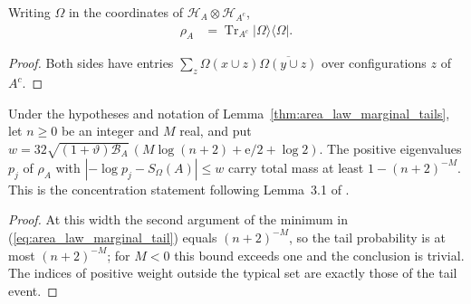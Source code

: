 \begin{lemma}
    \label{thm:area_law_cut_marginal}
    \leanok
    Writing $\Omega$ in the coordinates of $\mathcal H_A\otimes\mathcal H_{A^c}$,
    \begin{align}
        \rho_A & =\operatorname{Tr}_{A^c}|\Omega\rangle\langle\Omega|.
    \end{align}
\end{lemma}
\begin{proof}\leanok
    Both sides have entries
    $\sum_{z}\Omega(x\cup z)\overline{\Omega(y\cup z)}$ over configurations
    $z$ of $A^c$.
\end{proof}

\begin{lemma}
    \label{thm:area_law_typical_spectrum}
    \leanok
    Under the hypotheses and notation of
    Lemma~\ref{thm:area_law_marginal_tails}, let $n\ge0$ be an
    integer and $M$ real, and put
    $w=32\sqrt{(1+\vartheta)\mathcal B_A}\,(M\log(n+2)+\mathrm e/2+\log2)$.
    The positive eigenvalues $p_j$ of $\rho_A$ with
    $|-\log p_j-S_\Omega(A)|\le w$ carry total mass at least $1-(n+2)^{-M}$.
    This is the concentration statement following Lemma~3.1 of
    \cite{OpenAI2026AreaLaw}.
\end{lemma}
\begin{proof}\leanok
    At this width the second argument of the minimum in
    (\ref{eq:area_law_marginal_tail}) equals $(n+2)^{-M}$, so the tail
    probability is at most $(n+2)^{-M}$; for $M<0$ this bound exceeds one and
    the conclusion is trivial. The indices of positive weight outside the
    typical set are exactly those of the tail event.
\end{proof}

